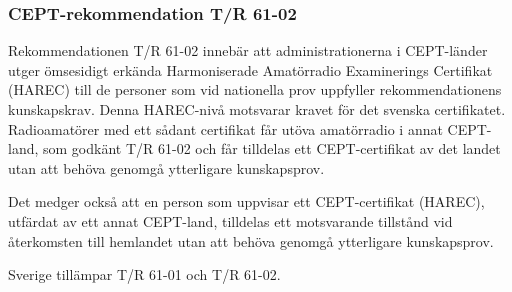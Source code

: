 \subsubsection{CEPT-rekommendation T/R 61-02}

Rekommendationen T/R 61-02 innebär att administrationerna i CEPT-länder utger
ömsesidigt erkända Harmoniserade Amatörradio Examinerings Certifikat (HAREC)
till de personer som vid nationella prov uppfyller rekommendationens
kunskapskrav. Denna HAREC-nivå motsvarar kravet för det svenska certifikatet.
Radioamatörer med ett sådant certifikat får utöva amatörradio i annat
CEPT-land, som godkänt T/R 61-02 och får tilldelas ett CEPT-certifikat av det
landet utan att behöva genomgå ytterligare kunskapsprov.

Det medger också att en person som uppvisar ett CEPT-certifikat
(HAREC), utfärdat av ett annat CEPT-land, tilldelas ett motsvarande
tillstånd vid återkomsten till hemlandet utan att behöva genomgå
ytterligare kunskapsprov.

Sverige tillämpar T/R 61-01 och T/R 61-02.
